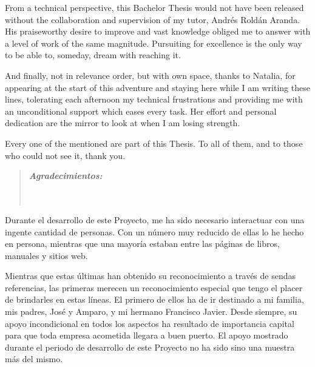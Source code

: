 From a technical perspective, this Bachelor Thesis would not have been released without the collaboration and supervision of my tutor, Andrés Roldán Aranda. His praiseworthy desire to improve and vast knowledge obliged me to answer with a level of work of the same magnitude. Pursuiting for excellence is the only way to be able to, someday, dream with reaching it.

And finally, not in relevance order, but with own space, thanks to Natalia, for appearing at the start of this adventure and staying here while I am writing these lines, tolerating each afternoon my technical frustrations and providing me with an unconditional support which eases every task. Her effort and personal dedication are the mirror to look at when I am losing strength.

Every one of the mentioned are part of this Thesis. To all of them, and to those who could not see it, thank you.



\clearpage
{}
{}


\begin{quotation}
\noindent \begin{center}
\textbf{\emph{\Large Agradecimientos:}}\textbf{\emph{\large }}\\
\textbf{\emph{\large }}\\
\textbf{\emph{\large }}\\
\textbf{\emph{\large }}
\par\end{center}{\large \par}
\end{quotation}

Durante el desarrollo de este Proyecto, me ha sido necesario interactuar con una ingente cantidad de personas. Con un número muy reducido de ellas lo he hecho en persona, mientras que una mayoría estaban entre las páginas de libros, manuales y sitios web.

Mientras que estas últimas han obtenido su reconocimiento a través de sendas referencias, las primeras merecen un reconocimiento especial que tengo el placer de brindarles en estas líneas. El primero de ellos ha de ir destinado a mi familia, mis padres, José y Amparo, y mi hermano Francisco Javier. Desde siempre, su apoyo incondicional en todos los aspectos ha resultado de importancia capital para que toda empresa acometida llegara a buen puerto. El apoyo mostrado durante el periodo de desarrollo de este Proyecto no ha sido sino una muestra más del mismo.

